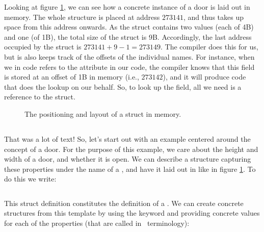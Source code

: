 Looking at figure \ref{fig:data:struct:alloc}, we can see how a concrete instance of a door is laid out in memory. The whole structure is placed at address $273141$, and thus takes up space from this address onwards. As the struct contains two  values (each of 4B) and one  (of 1B), the total size of the struct is 9B. Accordingly, the last address occupied by the struct is $273141+9-1=273149$. The compiler does this for us, but is also keeps track of the offsets of the individual names. For instance, when we in code refers to the  attribute in our code, the compiler knows that this field is stored at an offset of 1B in memory (i.e., $273142$), and it will produce code that does the lookup on our behalf. So, to look up the  field, all we need is a reference to the struct.

\begin{figure}[tbp]
  
  \caption{The positioning and layout of a  struct in memory.}
  \label{fig:data:struct:alloc}
\end{figure}

\subsection{\csharp}

That was a lot of text! So, let's start out with an example centered around the concept of a door. For the purpose of this example, we care about the height and width of a door, and whether it is open. We can describe a structure capturing these properties under the name of a , and have it laid out in  like in figure \ref{fig:data:struct:alloc}. To do this we write:

\inputminted[firstline=4]{csharp}{../src/csharp/primdata/doorstruct/Program.cs}

This struct definition constitutes the definition of a . We can create concrete  structures from this template by using the  keyword and providing concrete values for each of the properties (that are called  in \csharp\ terminology):

